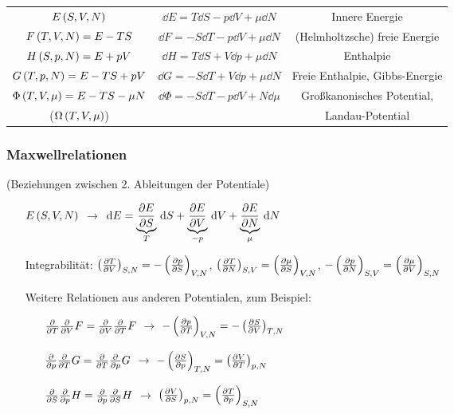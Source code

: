 \setlength{\tabcolsep}{0.45cm}
\begin{table}[H]
  \centering
  \begin{tabular}{c | c | c}\hline
    $E\left( S,V,N \right)$ & $\dd{E} = T \dd{S} - p \dd{V} + \mu \dd{N}$ & Innere Energie\\
    $F\left( T,V,N \right) = E - TS$ & $\dd{F} = - S \dd{T} - p \dd{V} + \mu \dd{N}$ & (Helmholtzsche) freie Energie\\
    $H\left( S,p,N \right) = E + pV$ & $\dd{H} = T \dd{S} + V \dd{p} + \mu \dd{N}$ & Enthalpie\\
    $G\left( T,p,N \right) = E - TS + pV$ & $\dd{G} = - S \dd{T} + V \dd{p} + \mu \dd{N}$ & Freie Enthalpie, Gibbs-Energie\\
    $\Phi\left( T,V,\mu \right)=E-TS-\mu N$ & $\dd{\Phi} = -S \dd{T} - p \dd{V} + N \dd{\mu}$ & Großkanonisches Potential, \\
    ($\Omega\left( T,V,\mu \right)$) & & Landau-Potential\\
  \hline
  \end{tabular}
\end{table}

\subsubsection{Maxwellrelationen}
(Beziehungen zwischen 2. Ableitungen der Potentiale)
\begin{itemize}[align=left]
  \item[$E\left( S,V,N \right)$] $\rightarrow$ $\,\text d{E} = \underbrace{\frac{\partial E}{\partial S}}_T \,\text d{S} + \underbrace{\frac{\partial E}{\partial V}}_{-p}\,\text d{V} + \underbrace{\frac{\partial E}{\partial N}}_{\mu}\,\text d{N}$
  \item[Integrabilität:] $\left(\frac{\partial T}{\partial V}\right)_{S,N} = - \left(\frac{\partial p}{\partial S}\right)_{V,N}$, $\left(\frac{\partial T}{\partial N}\right)_{S,V} = \left(\frac{\partial \mu}{\partial S}\right)_{V,N}$, $-\left(\frac{\partial p}{\partial N}\right)_{S,V} = \left(\frac{\partial \mu}{\partial V}\right)_{S,N}$
  \item[Weitere Relationen aus anderen Potentialen, zum Beispiel:]
  \item[]\begin{itemize}[align=left]
    \item[$\frac{\partial }{\partial T}\frac{\partial }{\partial V} F = \frac{\partial }{\partial V}\frac{\partial }{\partial T}F$] $\rightarrow$ $-\left(\frac{\partial p}{\partial T}\right)_{V,N} = - \left(\frac{\partial S}{\partial V}\right)_{T,N}$
    \item[$\frac{\partial }{\partial p}\frac{\partial }{\partial T} G = \frac{\partial }{\partial T}\frac{\partial }{\partial p} G$] $\rightarrow$ $-\left(\frac{\partial S}{\partial p}\right)_{T,N} = \left(\frac{\partial V}{\partial T}\right)_{p,N}$
    \item[$\frac{\partial }{\partial S}\frac{\partial }{\partial p} H = \frac{\partial }{\partial p}\frac{\partial }{\partial S} H$] $\rightarrow$ $\left(\frac{\partial V}{\partial S}\right)_{p,N} = \left(\frac{\partial T}{\partial p}\right)_{S,N}$
  \end{itemize}
\end{itemize}

